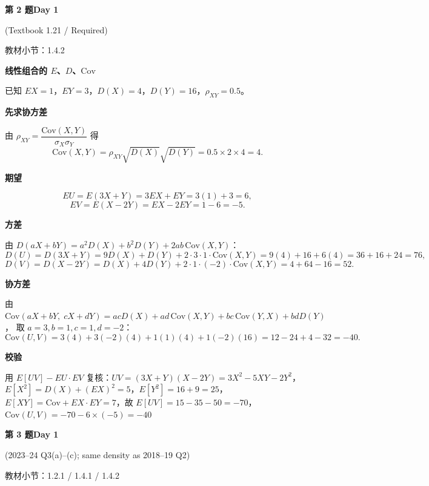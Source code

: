 \documentclass[10.5pt,fontset=fandol]{ctexart}
\newcommand{\key}[1]{\par\vspace{4pt}\noindent\textbf{\color{navy}#1}\par\vspace{2pt}}
\newcommand{\qtitle}[2]{\par\addvspace{1.2em}\Needspace{8\baselineskip}\begin{tcolorbox}[colback=navy,colframe=navy,arc=1.5pt,boxrule=0pt]\color{white}\large\bfseries #1\hfill\small #2\end{tcolorbox}}
\begin{document}
\qtitle{第 2 题}{Day 1}
{\small\color{accentred}(Textbook 1.21 / Required)}\par\smallskip
{\small\color{muted}教材小节：1.4.2}\par\medskip
\noindent\textbf{线性组合的 $E$、$D$、$\mathrm{Cov}$}\par\smallskip\begin{tcolorbox}[breakable,colback=qbg,colframe=qbg,boxrule=0pt]已知 $EX=1$，$EY=3$，$D(X)=4$，$D(Y)=16$，$\rho_{XY}=0.5$。

\key{先求协方差}
由 $\rho_{XY}=\dfrac{\mathrm{Cov}(X,Y)}{\sigma_X\sigma_Y}$ 得
\[
\mathrm{Cov}(X,Y)=\rho_{XY}\sqrt{D(X)}\sqrt{D(Y)}=0.5\times2\times4=4 .
\]

\key{期望}
\[
EU=E(3X+Y)=3EX+EY=3(1)+3=6,
\]
\[
EV=E(X-2Y)=EX-2EY=1-6=-5 .
\]

\key{方差}
由 $D(aX+bY)=a^2D(X)+b^2D(Y)+2ab\,\mathrm{Cov}(X,Y)$：
\[
D(U)=D(3X+Y)=9D(X)+D(Y)+2\cdot3\cdot1\cdot\mathrm{Cov}(X,Y)
=9(4)+16+6(4)=36+16+24=76,
\]
\[
D(V)=D(X-2Y)=D(X)+4D(Y)+2\cdot1\cdot(-2)\cdot\mathrm{Cov}(X,Y)
=4+64-16=52 .
\]

\key{协方差}
由 $\mathrm{Cov}(aX+bY,\;cX+dY)=acD(X)+ad\,\mathrm{Cov}(X,Y)+bc\,\mathrm{Cov}(Y,X)+bdD(Y)$，
取 $a=3,b=1,c=1,d=-2$：
\[
\mathrm{Cov}(U,V)=3(4)+3(-2)(4)+1(1)(4)+1(-2)(16)=12-24+4-32=-40 .
\]

\key{校验}
用 $E[UV]-EU\cdot EV$ 复核：$UV=(3X+Y)(X-2Y)=3X^2-5XY-2Y^2$，
$E[X^2]=D(X)+(EX)^2=5$，$E[Y^2]=16+9=25$，$E[XY]=\mathrm{Cov}+EX\cdot EY=7$，故
$E[UV]=15-35-50=-70$，$\mathrm{Cov}(U,V)=-70-6\times(-5)=-40$ \checkmark
\end{tcolorbox}
\qtitle{第 3 题}{Day 1}
{\small\color{accentred}(2023--24 Q3(a)--(c); same density as 2018--19 Q2)}\par\smallskip
{\small\color{muted}教材小节：1.2.1 / 1.4.1 / 1.4.2}\par\medskip
\end{document}
